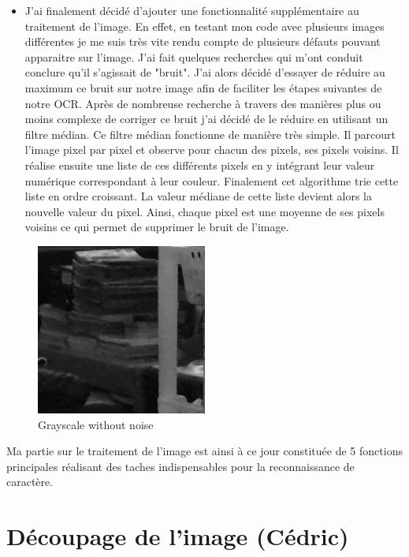 \documentclass[12pt]{report}
\begin{document}
\newpage
\begin{itemize}[label=\textbullet]
	\item J’ai finalement décidé d’ajouter une fonctionnalité supplémentaire au traitement de l’image. En effet, en testant mon code avec plusieurs images différentes je me suis très vite rendu compte de plusieurs défauts pouvant apparaitre sur l’image. J’ai fait quelques recherches qui m’ont conduit conclure qu’il s’agissait de "bruit". J’ai alors décidé d’essayer de réduire au maximum ce bruit sur notre image afin de faciliter les étapes suivantes de notre OCR. Après de nombreuse recherche à travers des manières plus ou moins complexe de corriger ce bruit j’ai décidé de le réduire en utilisant un filtre médian. Ce filtre médian fonctionne de manière très simple. Il parcourt l’image pixel par pixel et observe pour chacun des pixels, ses pixels voisins. Il réalise ensuite une liste de ces différents pixels en y intégrant leur valeur numérique correspondant à leur couleur. Finalement cet algorithme trie cette liste en ordre croissant. La valeur médiane de cette liste devient alors la nouvelle valeur du pixel. Ainsi, chaque pixel est une moyenne de ses pixels voisins ce qui permet de supprimer le bruit de l’image. 
\end{itemize}
\begin{figure}[H]
    \centering
    \includegraphics[width=0.5\textwidth]{noiseless_grayscale}
    \caption{Grayscale without noise}
\end{figure}

Ma partie sur le traitement de l’image est ainsi à ce jour constituée de 5 fonctions principales réalisant des taches indispensables pour la reconnaissance de caractère. 

\section{Découpage de l'image (Cédric)}
\end{document}
